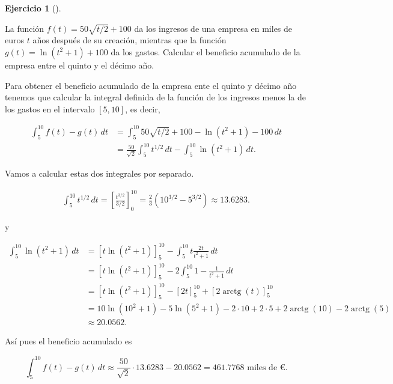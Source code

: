 \documentclass[
  spanish,
  a4paper,
]{scrreport}
\theoremstyle{definition}
\newtheorem{exercise}{Ejercicio}[chapter]
\theoremstyle{remark}
\begin{document}
\begin{exercise}[]\protect\hypertarget{exr-5}{}\label{exr-5}

La función \(f(t)=50\sqrt{t/2}+100\) da los ingresos de una empresa en
miles de euros \(t\) años después de su creación, mientras que la
función \(g(t)=\ln(t^2+1)+100\) da los gastos. Calcular el beneficio
acumulado de la empresa entre el quinto y el décimo año.

\end{exercise}

\begin{tcolorbox}[enhanced jigsaw, arc=.35mm, bottomrule=.15mm, bottomtitle=1mm, breakable, colback=white, colbacktitle=quarto-callout-tip-color!10!white, colframe=quarto-callout-tip-color-frame, coltitle=black, left=2mm, leftrule=.75mm, opacityback=0, opacitybacktitle=0.6, rightrule=.15mm, title=\textcolor{quarto-callout-tip-color}{\faLightbulb}\hspace{0.5em}{Solución}, titlerule=0mm, toprule=.15mm, toptitle=1mm]

Para obtener el beneficio acumulado de la empresa ente el quinto y
décimo año tenemos que calcular la integral definida de la función de
los ingresos menos la de los gastos en el intervalo \([5,10]\), es
decir,

\begin{align*}
\int_5^{10} f(t)-g(t) \,dt 
&= \int_5^{10} 50 \sqrt{t/2} + 100 - \ln(t^2+1)-100\,dt \\
&= \frac{50}{\sqrt{2}}\int_5^{10} t^{1/2} \,dt - \int_5^{10}  \ln(t^2+1)\, dt.
\end{align*}

Vamos a calcular estas dos integrales por separado.

\begin{align*}
\int_5^{10} t^{1/2}\,dt =  \left[\frac{t^{3/2}}{3/2}\right]_0^{10} = \frac{2}{3}(10^{3/2}-5^{3/2}) \approx 13.6283.
\end{align*}

y

\begin{align*}
\int_5^{10}  \ln(t^2+1)\,dt 
&= [t \ln(t^2+1)]_5^{10} - \int_5^{10} t \frac{2t}{t^2+1}\,dt \tag{Partes}\\
&= [t \ln(t^2+1)]_5^{10} - 2\int_5^{10} 1 - \frac{1}{t^2+1}\,dt\\
&=  [t \ln(t^2+1)]_5^{10} - [2t]_5^{10} + [2\operatorname{arctg}(t)]_5^{10} \\
&= 10\ln(10^2+1)-5\ln(5^2+1) -2\cdot 10+2\cdot 5 + 2\operatorname{arctg}(10)- 2\operatorname{arctg}(5) \\
&\approx 20.0562.
\end{align*}

Así pues el beneficio acumulado es

\[
\int_5^{10} f(t)-g(t) \,dt \approx \frac{50}{\sqrt{2}} \cdot 13.6283 - 20.0562  = 461.7768  \mbox{ miles de €}.
\]

\end{tcolorbox}
\end{document}
